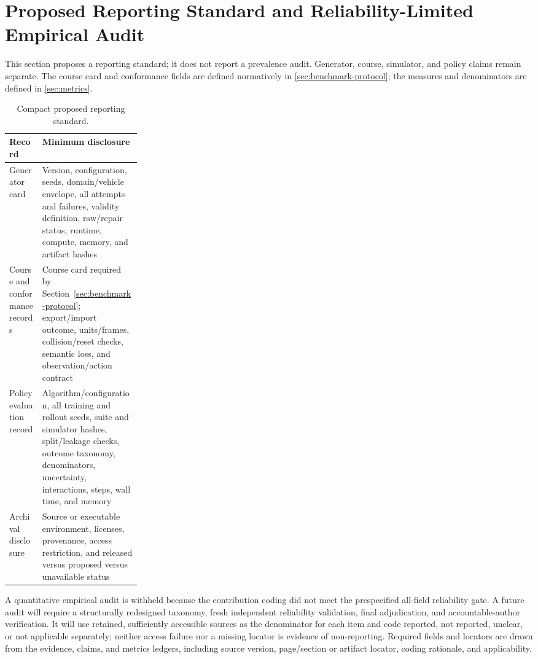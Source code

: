 \section{Proposed Reporting Standard and Reliability-Limited Empirical Audit}
\label{sec:reporting-practices}

This section proposes a reporting standard; it does not report a prevalence audit.
Generator, course, simulator, and policy claims remain separate. The course card and
conformance fields are defined normatively in \cref{sec:benchmark-protocol}; the
measures and denominators are defined in \cref{sec:metrics}.

\begin{table}[t]
  \centering
  \caption{Compact proposed reporting standard.}
  \label{tab:reporting-standard}
  \small
  \begin{tabularx}{\linewidth}{@{}>{\raggedright\arraybackslash}p{0.25\linewidth}Y@{}}
    \toprule
    Record & Minimum disclosure \\
    \midrule
    Generator card & Version, configuration, seeds, domain/vehicle envelope, all
    attempts and failures, validity definition, raw/repair status, runtime, compute,
    memory, and artifact hashes \\
    Course and conformance records & Course card required by
    Section~\ref{sec:benchmark-protocol}; export/import outcome, units/frames,
    collision/reset checks, semantic loss, and observation/action contract \\
    Policy evaluation record & Algorithm/configuration, all training and rollout
    seeds, suite and simulator hashes, split/leakage checks, outcome taxonomy,
    denominators, uncertainty, interactions, steps, wall time, and memory \\
    Archival disclosure & Source or executable environment, licenses, provenance,
    access restriction, and released versus proposed versus unavailable status \\
    \bottomrule
  \end{tabularx}
\end{table}

A quantitative empirical audit is withheld because the contribution coding did not
meet the prespecified all-field reliability gate. A future audit will require a
structurally redesigned taxonomy, fresh independent reliability validation, final
adjudication, and accountable-author verification. It will use retained, sufficiently
accessible sources as the denominator for each item and code reported, not reported,
unclear, or not applicable separately; neither access failure nor a missing locator is
evidence of non-reporting. Required fields and locators are drawn from the evidence,
claims, and metrics ledgers, including source version, page/section or artifact
locator, coding rationale, and applicability.

